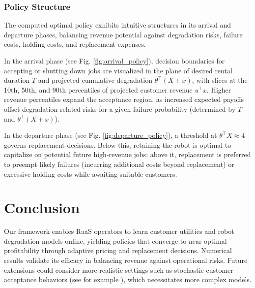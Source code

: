 \documentclass[conference]{IEEEtran}
\begin{document}
\subsubsection{Policy Structure}
The computed optimal policy exhibits intuitive structures in its arrival and departure phases, balancing revenue potential against degradation risks, failure costs, holding costs, and replacement expenses.

In the arrival phase (see Fig. \ref{fig:arrival_policy}), decision boundaries for accepting or shutting down jobs are visualized in the plane of desired rental duration $T$ and projected cumulative degradation $\theta^\top (X+x)$, with slices at the 10th, 50th, and 90th percentiles of projected customer revenue $u^\top x$. Higher revenue percentiles expand the acceptance region, as increased expected payoffs offset degradation-related risks for a given failure probability (determined by $T$ and $\theta^\top(X+x)$).

In the departure phase (see Fig. \ref{fig:departure_policy}), a threshold at $\theta^\top X \approx 4$ governs replacement decisions. Below this, retaining the robot is optimal to capitalize on potential future high-revenue jobs; above it, replacement is preferred to preempt likely failures (incurring additional costs beyond replacement) or excessive holding costs while awaiting suitable customers. %

\section{Conclusion}
Our framework enables RaaS operators to learn customer utilities and robot degradation models online, yielding policies that converge to near-optimal profitability through adaptive pricing and replacement decisions. Numerical results validate its efficacy in balancing revenue against operational risks. Future extensions could consider more realistic settings such as stochastic customer acceptance behaviors (see for example \cite{dogan2023estimating}), which necessitates more complex models.



\end{document}
